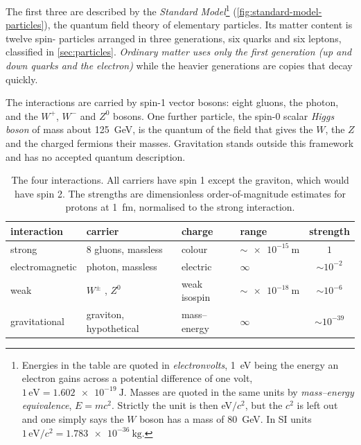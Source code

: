     The first three are described by the \emph{Standard Model}\footnote{Energies in the table are quoted in \emph{electronvolts}, \qty{1}{\electronvolt} being the energy an electron gains across a potential difference of one volt, $1\,\mathrm{eV}=\qty{1.602e-19}{\joule}$. Masses are quoted in the same units by \emph{mass--energy equivalence}, $E=mc^{2}$. Strictly the unit is then eV$/c^{2}$, but the $c^{2}$ is left out and one simply says the $W$ boson has a mass of \qty{80}{\giga\electronvolt}. In SI units $1\,\mathrm{eV}/c^{2}=\qty{1.783e-36}{\kilogram}$.} (\cref{fig:standard-model-particles}), the quantum field theory of elementary particles. Its matter content is twelve spin- particles arranged in three generations, six quarks and six leptons, classified in \cref{sec:particles}. \emph{Ordinary matter uses only the first generation (up and down quarks and the electron)} while the heavier generations are copies that decay quickly.

    The interactions are carried by spin-1 vector bosons: eight gluons, the photon, and the $W^{+}$, $W^{-}$ and $Z^{0}$ bosons. One further particle, the spin-0 scalar \emph{Higgs boson} of mass about \qty{125}{\giga\electronvolt}, is the quantum of the field that gives the $W$, the $Z$ and the charged fermions their masses. Gravitation stands outside this framework and has no accepted quantum description.

    \begin{table}[H]
        \centering
        \renewcommand{\arraystretch}{1.25}
        \begin{tabular}{@{}llllc@{}}
            \hline
            \textbf{interaction} & \textbf{carrier} & \textbf{charge} & \textbf{range} & \textbf{strength} \\
            \hline
            \rule{0pt}{2.6ex}strong & 8 gluons, massless & colour & ${\sim}\qty{e-15}{\metre}$ & $1$ \\
            electromagnetic & photon, massless & electric & $\infty$ & $\sim10^{-2}$ \\
            weak & $W^{\pm}$ , $Z^{0}$ & weak isospin & ${\sim}\qty{e-18}{\metre}$ & $\sim10^{-6}$ \\
            gravitational & graviton, hypothetical & mass--energy & $\infty$ & $\sim10^{-39}$ \\
            \hline
        \end{tabular}
        \caption{The four interactions. All carriers have spin 1 except the graviton, which would have spin 2. The strengths are dimensionless order-of-magnitude estimates for protons at \qty{1}{\femto\metre}, normalised to the strong interaction.}
        \label{tab:interactions}
    \end{table}


